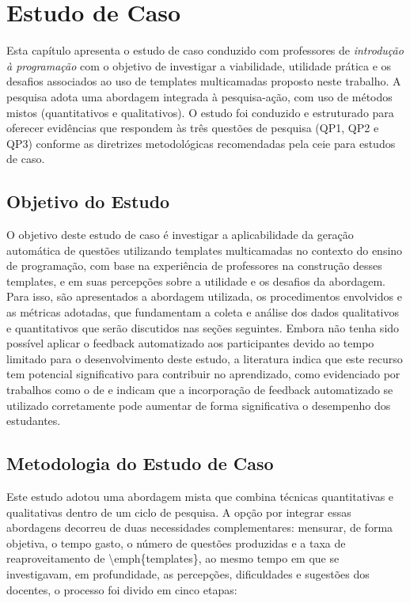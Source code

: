 \chapter{Estudo de Caso}

Esta capítulo apresenta o estudo de caso conduzido com professores de \textit{introdução à programação} com o objetivo de investigar a viabilidade, utilidade prática e os desafios associados ao uso de templates multicamadas proposto neste trabalho. A pesquisa adota uma abordagem integrada à pesquisa-ação, com uso de métodos mistos (quantitativos e qualitativos). O estudo foi conduzido e estruturado para oferecer evidências que respondem às três questões de pesquisa (QP1, QP2 e QP3) conforme as diretrizes metodológicas recomendadas pela \gls{ceie} para estudos de caso.

\section{Objetivo do Estudo}
O objetivo deste estudo de caso é investigar a aplicabilidade da geração automática de questões utilizando templates multicamadas no contexto do ensino de programação, com base na experiência de professores na construção desses templates, e em suas percepções sobre a utilidade e os desafios da abordagem. Para isso, são apresentados a abordagem utilizada,  os procedimentos envolvidos e as métricas adotadas, que fundamentam a coleta e análise dos dados qualitativos e quantitativos que serão discutidos nas seções seguintes.
Embora não tenha sido possível aplicar o feedback automatizado aos participantes devido ao tempo limitado para o desenvolvimento deste estudo, a literatura  indica que este recurso tem potencial significativo para contribuir no aprendizado, como evidenciado por trabalhos como o de \parencite{vanpraet2024} e \parencite{fung2024} indicam que a incorporação de feedback automatizado se utilizado corretamente pode aumentar de forma significativa o desempenho dos estudantes.

\section{Metodologia do Estudo de Caso}

Este estudo adotou uma abordagem mista que combina técnicas quantitativas e qualitativas dentro de um ciclo de pesquisa. A opção por integrar essas abordagens decorreu de duas necessidades complementares: mensurar, de forma objetiva, o tempo gasto, o número de questões produzidas e a taxa de reaproveitamento de \textbackslash{}emph\{templates\}, ao mesmo tempo em que se investigavam, em profundidade, as percepções, dificuldades e sugestões dos docentes, o processo foi divido em cinco etapas:  

